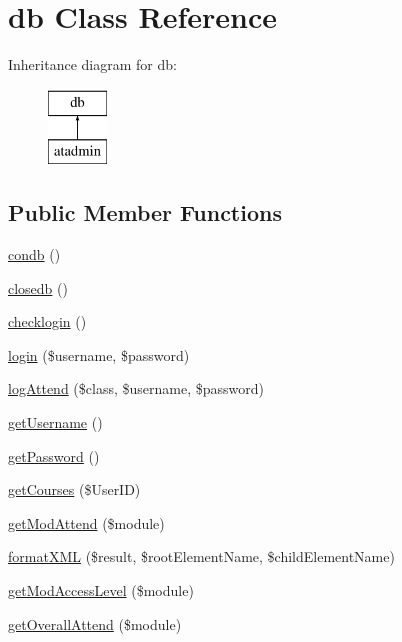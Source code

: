 \hypertarget{classdb}{\section{db Class Reference}
\label{classdb}
}
Inheritance diagram for db\-:\begin{figure}[H]
\begin{center}
\leavevmode
\includegraphics[height=2.000000cm]{classdb}
\end{center}
\end{figure}
\subsection*{Public Member Functions}
\begin{DoxyCompactItemize}
\item 
\hyperlink{classdb_aadb6cdfdaf2a6596ecbe1a60e24b51ac}{condb} ()
\item 
\hyperlink{classdb_aa36d52ba4bb4a7696119c537187a37eb}{closedb} ()
\item 
\hyperlink{classdb_a95ff0a9a55f03aaade9edbb977595061}{checklogin} ()
\item 
\hyperlink{classdb_ad870c94a5775868891f6c50b9818d627}{login} (\$username, \$password)
\item 
\hyperlink{classdb_ae8aa276bf5607f9dc5e8877d18cec9a5}{log\-Attend} (\$class, \$username, \$password)
\item 
\hyperlink{classdb_a81b37a3c9d639574e394f80c1138c75e}{get\-Username} ()
\item 
\hyperlink{classdb_a04e0957baeb7acde9c0c86556da2d43f}{get\-Password} ()
\item 
\hyperlink{classdb_aab5647a5bd77aa3eb60010b4258ae11e}{get\-Courses} (\$User\-I\-D)
\item 
\hyperlink{classdb_aafaff27dbe8ed98b9ce03af5047b2d22}{get\-Mod\-Attend} (\$module)
\item 
\hyperlink{classdb_ac87d4cfaf79b234def1019bd9faa9421}{format\-X\-M\-L} (\$result, \$root\-Element\-Name, \$child\-Element\-Name)
\item 
\hyperlink{classdb_a6413de1c7e932e73b97142084a9e4a40}{get\-Mod\-Access\-Level} (\$module)
\item 
\hyperlink{classdb_a723148b84aa331ce72baf09cdaedcabe}{get\-Overall\-Attend} (\$module)
\end{DoxyCompactItemize}
